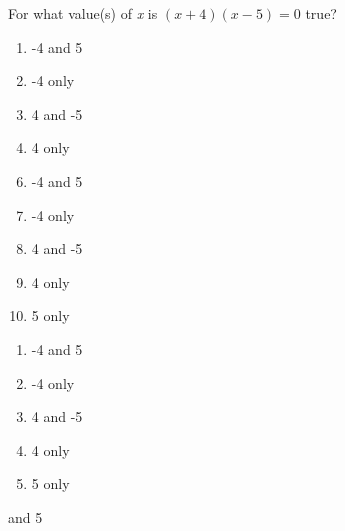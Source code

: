 For what value(s) of \textit{x} is $(\textit{x}+4)(\textit{x}-5)=0$ true?

\ifsat
	\begin{enumerate}[label=\Alph*)]
		\item   -4 and 5 %
		\item  -4 only
		\item  4 and -5
		\item  4 only
	\end{enumerate}
\else
\fi

\ifacteven
	\begin{enumerate}[label=\textbf{\Alph*.},itemsep=\fill,align=left]
		\setcounter{enumii}{5}
		\item   -4 and 5 %
		\item  -4 only
		\item  4 and -5
		\addtocounter{enumii}{1}
		\item  4 only
		\item  5 only
	\end{enumerate}
\else
\fi

\ifactodd
	\begin{enumerate}[label=\textbf{\Alph*.},itemsep=\fill,align=left]
		\item   -4 and 5 %
		\item  -4 only
		\item  4 and -5
		\item  4 only
		\item  5 only
	\end{enumerate}
\else
\fi

 and 5 %
		
\else
\fi

